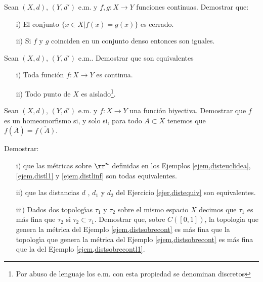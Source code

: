 \begin{ejercicio} Sean $(X,d)$, $(Y,d')$ e.m. y $f,g:X\rightarrow Y$
 funciones continuas. Demostrar que:
 \begin{itemize}
    \item[i)]  El conjunto $\{x\in X| f(x)=g(x)\}$ es cerrado.
    \item[ii)] Si $f$ y $g$ coinciden en un conjunto denso
    entonces son iguales.
 \end{itemize}
 \end{ejercicio}

\begin{ejercicio} Sean $(X,d)$, $(Y,d')$ e.m.. Demostrar que son equivalentes
\begin{itemize}
    \item[i)] Toda funci\'on $f:X\rightarrow Y$ es continua.
    \item[ii)] Todo punto de $X$ es aislado\footnote{Por abuso de
    lenguaje los e.m. con esta propiedad se denominan discretos}.
\end{itemize}
\end{ejercicio}


\begin{ejercicio} Sean $(X,d)$, $(Y,d')$ e.m. y $f:X\rightarrow Y$
 una funci\'on biyectiva. Demostrar que $f$ es un homeomorfismo
 si, y solo si, para todo $A\subset X$ tenemos que
 $f(\overline{A})=\overline{f(A)}$.
 \end{ejercicio}

 \begin{ejercicio} Demostrar:
 \begin{itemize}
    \item[i)] que las m\'etricas sobre $\rr^n$
    definidas en los Ejemplos \vref{ejem,disteuclidea},
    \vref{ejem,distl1} y \vref{ejem,distlinf} son todas equivalentes.
    \item[ii)] que las distancias $d$ , $d_1$ y $d_2$ del Ejercicio
    \vref{ejer,distequiv} son equivalentes.
    \item[iii)] Dados dos topolog\'{\i}as $\tau_1$ y $\tau_2$
    sobre el mismo espacio $X$ decimos que $\tau_1$ es m\'as fina
    que $\tau_2$ si $\tau_2\subset \tau_1$. Demostrar que, sobre $C([0,1])$,
    la topolog\'{\i}a que genera la m\'etrica del
    Ejemplo \vref{ejem,distsobrecont} es m\'as fina que la
    topolog\'{\i}a que genera la m\'etrica del Ejemplo
    \vref{ejem,distsobrecont} es m\'as fina que la del
    Ejemplo \vref{ejem,distsobrecontl1}.
 \end{itemize}
 \end{ejercicio}
